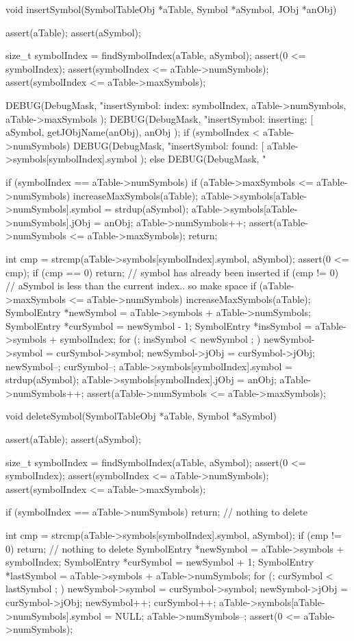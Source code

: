 void insertSymbol(SymbolTableObj *aTable, Symbol *aSymbol, JObj *anObj) {
  assert(aTable);
  assert(aSymbol);
  
  size_t symbolIndex = findSymbolIndex(aTable, aSymbol);
  assert(0 <= symbolIndex);
  assert(symbolIndex <= aTable->numSymbols);
  assert(symbolIndex <= aTable->maxSymbols);
  
  DEBUG(DebugMask,
    "insertSymbol: index: %
    symbolIndex,
    aTable->numSymbols,
    aTable->maxSymbols
  );
  DEBUG(DebugMask,
    "insertSymbol: inserting: [%
    aSymbol,
    getJObjName(anObj),
    anObj
  );
  if (symbolIndex < aTable->numSymbols) {
    DEBUG(DebugMask,
      "insertSymbol: found: [%
      aTable->symbols[symbolIndex].symbol
    );
  } else {
    DEBUG(DebugMask, "%
  }
  
  if (symbolIndex == aTable->numSymbols) {
    if (aTable->maxSymbols <= aTable->numSymbols) increaseMaxSymbols(aTable);
    aTable->symbols[aTable->numSymbols].symbol = strdup(aSymbol);
    aTable->symbols[aTable->numSymbols].jObj   = anObj;
    aTable->numSymbols++;
    assert(aTable->numSymbols <= aTable->maxSymbols);
    return;
  }
  
  int cmp = strcmp(aTable->symbols[symbolIndex].symbol, aSymbol);
  assert(0 <= cmp);
  if (cmp == 0) return; // symbol has already been inserted
  if (cmp != 0) { // aSymbol is less than the current index.. so make space
    if (aTable->maxSymbols <= aTable->numSymbols) increaseMaxSymbols(aTable);
    SymbolEntry *newSymbol = aTable->symbols + aTable->numSymbols;
    SymbolEntry *curSymbol = newSymbol - 1;
    SymbolEntry *insSymbol = aTable->symbols + symbolIndex;
    for (; insSymbol < newSymbol ; ) {
      newSymbol->symbol = curSymbol->symbol;
      newSymbol->jObj   = curSymbol->jObj;
      newSymbol--;
      curSymbol--;
    }
  }
  aTable->symbols[symbolIndex].symbol = strdup(aSymbol);
  aTable->symbols[symbolIndex].jObj   = anObj;
  aTable->numSymbols++;
  assert(aTable->numSymbols <= aTable->maxSymbols);
}

void deleteSymbol(SymbolTableObj *aTable, Symbol *aSymbol) {
  assert(aTable);
  assert(aSymbol);
  
  size_t symbolIndex = findSymbolIndex(aTable, aSymbol);
  assert(0 <= symbolIndex);
  assert(symbolIndex <= aTable->numSymbols);
  assert(symbolIndex <= aTable->maxSymbols);

  if (symbolIndex == aTable->numSymbols) return; // nothing to delete
  
  int cmp = strcmp(aTable->symbols[symbolIndex].symbol, aSymbol);
  if (cmp != 0) return; // nothing to delete
  SymbolEntry *newSymbol = aTable->symbols + symbolIndex;
  SymbolEntry *curSymbol = newSymbol + 1;
  SymbolEntry *lastSymbol = aTable->symbols + aTable->numSymbols;
  for (; curSymbol < lastSymbol ; ) {
    newSymbol->symbol = curSymbol->symbol;
    newSymbol->jObj   = curSymbol->jObj;
    newSymbol++;
    curSymbol++;
  }
  aTable->symbols[aTable->numSymbols].symbol = NULL;
  aTable->numSymbols--;
  assert(0 <= aTable->numSymbols);
}

